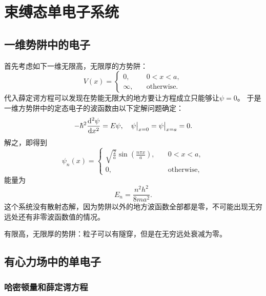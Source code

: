 \documentclass[UTF8, a4paper]{ctexart}
\begin{document}
\section{束缚态单电子系统}

\subsection{一维势阱中的电子}

首先考虑如下一维无限高，无限厚的方势阱：
\begin{equation}
    V(x) = \begin{cases}
        0, \quad &0 < x < a, \\
        \infty, \quad &\text{otherwise}.
    \end{cases}
\end{equation}
代入薛定谔方程可以发现在势能无限大的地方要让方程成立只能够让$\psi=0$。
于是一维方势阱中的定态电子的波函数由以下定解问题确定：
\[
    - \hbar^2 \dv[2]{\psi}{x} = E \psi, \quad \psi\big|_{x=0} = \psi\big|_{x=a} = 0.
\]
解之，即得到
\begin{equation}
    \psi_n(x) = \begin{cases}
        \sqrt{\frac{2}{a}} \sin(\frac{n \pi x}{a}), \quad &0 < x < a, \\
        0, \quad &\text{otherwise},
    \end{cases}
\end{equation}
能量为
\begin{equation}
    E_n = \frac{n^2 h^2}{8 m a^2}.
\end{equation}
这个系统没有散射态解，因为势阱以外的地方波函数全部都是零，不可能出现无穷远处还有非零波函数值的情况。

有限高，无限厚的势阱：粒子可以有隧穿，但是在无穷远处衰减为零。

\subsection{有心力场中的单电子}

\subsubsection{哈密顿量和薛定谔方程}
\end{document}

